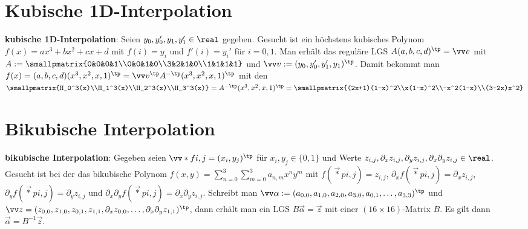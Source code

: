 \section{%
    Kubische 1D-Interpolation%
}

\textbf{kubische 1D-Interpolation}:
Seien $y_0, y_0', y_1, y_1' \in \real$ gegeben.
Gesucht ist ein höchstens kubisches Polynom $f(x) = ax^3 + bx^2 + cx + d$
mit $f(i) = y_i$ und $f'(i) = y_i'$ für $i = 0, 1$.
Man erhält das reguläre LGS
$A (a, b, c, d)^\tp = \vec{v}$ mit
$A := \smallpmatrix{0&0&0&1\\0&0&1&0\\3&2&1&0\\1&1&1&1}$ und
$\vec{v} := (y_0, y_0', y_1', y_1)^\tp$.
Damit bekommt man
$f(x) = (a, b, c, d) (x^3, x^2, x, 1)^\tp
= \vec{v}^\tp A^{-\tp} (x^3, x^2, x, 1)^\tp$
mit den\\
$\smallpmatrix{H_0^3(x)\\H_1^3(x)\\H_2^3(x)\\H_3^3(x)}
= A^{-\tp} (x^3, x^2, x, 1)^\tp
= \smallpmatrix{(2x+1)(1-x)^2\\x(1-x)^2\\-x^2(1-x)\\(3-2x)x^2}$

\section{%
    Bikubische Interpolation%
}

\textbf{bikubische Interpolation}:
Gegeben seien $\vec*{f}{i,j} = (x_i, y_j)^\tp$ für $x_i, y_j \in \{0, 1\}$
und Werte $z_{i,j}, \partial_x z_{i,j}, \partial_y z_{i,j},
\partial_x \partial_y z_{i,j} \in \real$.
Gesucht ist bei der  das bikubische Polynom
$f(x, y) = \sum_{n=0}^3 \sum_{m=0}^3 a_{n,m} x^n y^m$ mit
$f(\vec*{p}{i,j}) = z_{i,j}$,
$\partial_x f(\vec*{p}{i,j}) = \partial_x z_{i,j}$,
$\partial_y f(\vec*{p}{i,j}) = \partial_y z_{i,j}$ und
$\partial_x \partial_y f(\vec*{p}{i,j}) = \partial_x \partial_y z_{i,j}$.
Schreibt man $\vec{\alpha} := (a_{0,0}, a_{1,0}, a_{2,0}, a_{3,0}, a_{0,1}, \dotsc, a_{3,3})^\tp$
und\\
$\vec{z} = (z_{0,0}, z_{1,0}, z_{0,1}, z_{1,1}, \partial_x z_{0,0}, \dotsc,
\partial_x \partial_y z_{1,1})^\tp$,
dann erhält man ein LGS $B\vec{\alpha} = \vec{z}$
mit einer $(16 \times 16)$-Matrix $B$.
Es gilt dann $\vec{\alpha} = B^{-1} \vec{z}$.

